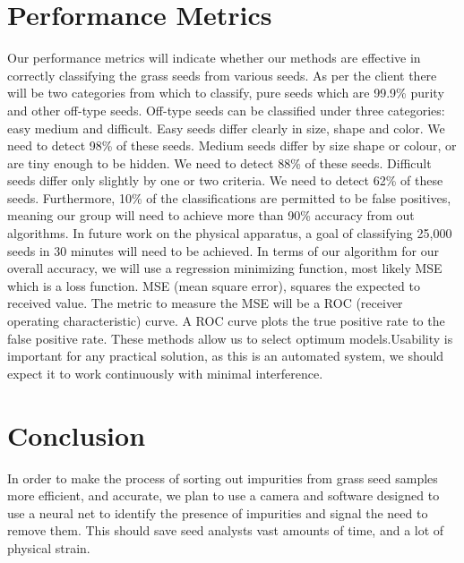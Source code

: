 \documentclass[onecolumn, draftclsnofoot,10pt, compsoc]{IEEEtran}
\begin{document}
\section{Performance Metrics}

Our performance metrics will indicate whether our methods are effective in correctly classifying the grass seeds from various seeds. As per the client there will be two categories from which to classify, pure seeds which are 99.9\% purity and other off-type seeds. Off-type seeds can be classified under three categories: easy medium and difficult. Easy seeds differ clearly in size, shape and color. We need to detect 98\% of these seeds. Medium seeds differ by size shape or colour, or are tiny enough to be hidden. We need to detect 88\% of these seeds. Difficult seeds differ only slightly by one or two criteria. We need to detect 62\% of these seeds.
Furthermore, 10\% of the classifications are permitted to be false positives, meaning our group will need to achieve more than 90\% accuracy from out algorithms. In future work on the physical apparatus, a goal of classifying 25,000 seeds in 30 minutes will need to be achieved. In terms of our algorithm for our overall accuracy, we will use a regression minimizing function, most likely MSE which is a loss function. MSE (mean square error), squares the expected to received value. The metric to measure the MSE will be a ROC (receiver operating characteristic) curve. A ROC curve plots the true positive rate to the false positive rate. These methods allow us to select optimum models.Usability is important for any practical solution, as this is an automated system, we should expect it to work continuously with minimal interference.  

\section{Conclusion}
In order to make the process of sorting out impurities from grass seed samples more efficient, and accurate, we plan to use a camera and software designed to use a neural net to identify the presence of impurities and signal the need to remove them. This should save seed analysts vast amounts of time, and a lot of physical strain. 
\end{document}
